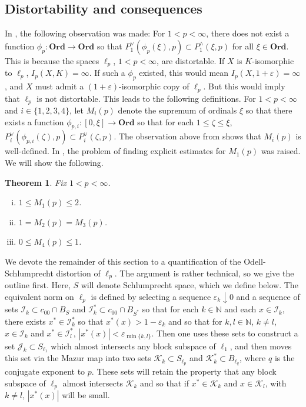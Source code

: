 \documentclass[12pt]{amsart}
\newtheorem{theorem}{Theorem}[section]
\theoremstyle{definition}
\newcommand{\ord}{\textbf{Ord}}
\newcommand{\nn}{\mathbb{N}}
\newcommand{\kkk}{\mathcal{K}}
\newcommand{\iii}{\mathcal{I}}
\newcommand{\jjj}{\mathcal{J}}
\begin{document}
  






\subsection{Distortability and consequences}

In \cite{JO}, the following observation was made:  For $1<p<\infty$, there does not exist a function $\phi_p:\ord\to \ord$ so that $P^\vee_1(\phi_p(\xi), p)\subset P^\wedge_1(\xi, p)$ for all $\xi\in \ord$.  This is because the spaces $\ell_p$, $1<p<\infty$, are distortable.  If $X$ is $K$-isomorphic to $\ell_p$, $I_p(X, K)=\infty$.  If such a $\phi_p$ existed, this would mean $I_p(X, 1+\varepsilon)=\infty$, and $X$ must admit a $(1+\varepsilon)$-isomorphic copy of $\ell_p$.  But this would imply that $\ell_p$ is not distortable.  This leads to the following definitions.  For $1<p<\infty$ and $i\in \{1,2,3,4\}$, let $M_i(p)$ denote the supremum of ordinals $\xi$ so that there exists a function $\phi_{p,i}:[0, \xi]\to \ord$ so that for each $1\leqslant \zeta\leqslant \xi$, $P^\vee_i(\phi_{p,i}(\zeta), p)\subset P^\vee_i(\zeta, p)$. The observation above from \cite{JO} shows that $M_i(p)$ is well-defined.  In \cite{JO}, the problem of finding explicit estimates for $M_1(p)$ was raised.  We will show the following.  


\begin{theorem} Fix $1<p<\infty$.  \begin{enumerate}[(i)]\item $1\leqslant M_1(p)\leqslant 2$. \item $1=M_2(p)=M_3(p)$. \item $0\leqslant M_4(p)\leqslant 1$. \end{enumerate}

\label{neg constant}


\end{theorem}



We devote the remainder of this section to a quantification of the Odell-Schlumprecht distortion of $\ell_p$.  The argument is rather technical, so we give the outline first. Here, $S$ will denote Schlumprecht space, which we define below.  The equivalent norm on $\ell_p$ is defined by selecting a sequence $\varepsilon_k\downarrow 0$ and a sequence of sets $\iii_k\subset c_{00}\cap B_S$ and $\iii_k^*\subset c_{00}\cap B_{S^*}$ so that for each $k\in \nn$ and each $x\in \iii_k$, there exists $x^*\in \iii_k^*$ so that $x^*(x)>1-\varepsilon_k$ and so that for $k,l\in \nn$, $k\neq l$, $x\in \iii_k$ and $x^*\in \iii_l^*$, $|x^*(x)|< \varepsilon_{\min \{k,l\}}$.  Then one uses these sets to construct a set $\jjj_k\subset S_{\ell_1}$ which almost intersects any block subspace of $\ell_1$, and then moves this set via the Mazur map into two sets $\kkk_k\subset S_{\ell_p}$ and $\kkk^*_k\subset B_{\ell_q}$, where $q$ is the conjugate exponent to $p$.  These sets will retain the property that any block subspace of $\ell_p$ almost intersects $\kkk_k$ and so that if $x^*\in \kkk_k$ and $x\in \kkk_l$, with $k\neq l$, $|x^*(x)|$ will be small.  
\end{document}
